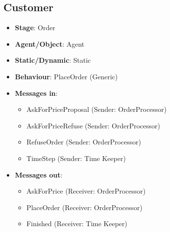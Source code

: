 \documentclass[12pt]{article}
\begin{document}
\subsection{Customer}%
\label{sub:customer_agent}
\begin{itemize}
    \item \textbf{Stage}: Order
    \item \textbf{Agent/Object}: Agent
    \item \textbf{Static/Dynamic}: Static
    \item \textbf{Behaviour}: PlaceOrder (Generic)
    \item \textbf{Messages in}:
        \begin{itemize}
            \item AskForPriceProposal (Sender: OrderProcessor)
            \item AskForPriceRefuse (Sender: OrderProcessor)
            \item RefuseOrder (Sender: OrderProcessor)
            \item TimeStep (Sender: Time Keeper)
        \end{itemize}
    \item \textbf{Messages out}:
        \begin{itemize}
            \item AskForPrice (Receiver: OrderProcessor)
            \item PlaceOrder (Receiver: OrderProcessor)
            \item Finished (Receiver: Time Keeper)
        \end{itemize}
\end{itemize}
\end{document}
